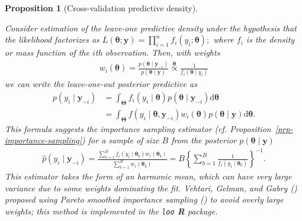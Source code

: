 \documentclass[
  11pt,
  letterpaper,
]{scrbook}
\theoremstyle{plain}
\theoremstyle{plain}
\newtheorem{proposition}{Proposition}[chapter]
\theoremstyle{definition}
\theoremstyle{definition}
\theoremstyle{definition}
\theoremstyle{plain}
\theoremstyle{remark}
\begin{document}
\begin{proposition}[Cross-validation predictive
density]\protect\hypertarget{prp-cv-predictive-dens}{}\label{prp-cv-predictive-dens}

Consider estimation of the leave-one predictive density under the
hypothesis that the likelihood factorizes as
\(L(\boldsymbol{\theta}; \boldsymbol{y}) = \prod_{i=1}^n f_i(y_i; \boldsymbol{\theta});\)
where \(f_i\) is the density or mass function of the \(i\)th
observation. Then, with weights \begin{align*}
w_i(\boldsymbol{\theta}) = \frac{p(\boldsymbol{\theta} \mid \boldsymbol{y}_{-i})}{p(\boldsymbol{\theta} \mid \boldsymbol{y})} \stackrel{\boldsymbol{\theta}}{\propto} \frac{1}{f_i(\boldsymbol{\theta} \mid y_i)}
\end{align*} we can write the leave-one-out posterior predictive as
\begin{align*}
p(y_i \mid \boldsymbol{y}_{-i}) &= \int_{\boldsymbol{\Theta}} f_i(y_i \mid \boldsymbol{\theta}) p(\boldsymbol{\theta} \mid \boldsymbol{y}_{-i}) \mathrm{d} \boldsymbol{\theta}
\\& = \int_{\boldsymbol{\Theta}} f(y_i \mid \boldsymbol{\theta}, \boldsymbol{y}_{-i}) w_i(\boldsymbol{\theta}) p(\boldsymbol{\theta} \mid \boldsymbol{y}) \mathrm{d} \boldsymbol{\theta}.
\end{align*} This formula suggests the importance sampling estimator
(cf. Proposition~\ref{prp-importance-sampling}) for a sample of size
\(B\) from the posterior \(p(\boldsymbol{\theta} \mid \boldsymbol{y})\)
\begin{align*}
\widehat{p}(y_i \mid \boldsymbol{y}_{-i}) = \frac{\sum_{b=1}^B f_i(y_i \mid \boldsymbol{\theta}_b) w_i(\boldsymbol{\theta}_b)}{\sum_{b=1}^Bw_i(\boldsymbol{\theta}_b)}  = B \left\{\sum_{b=1}^B \frac{1}{f_i (y_i \mid \boldsymbol{\theta}_b)}\right\}^{-1}.
\end{align*} This estimator takes the form of an harmonic mean, which
can have very large variance due to some weights dominating the fit.
Vehtari, Gelman, and Gabry
() proposed using Pareto
smoothed importance sampling
() to avoid overly large weights; this method is implemented in the
\texttt{loo} \textbf{R} package.


\end{proposition}
\end{document}
